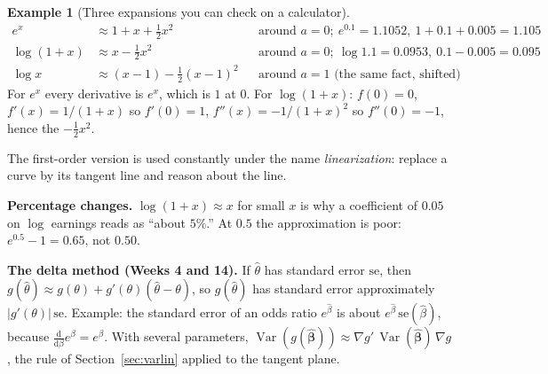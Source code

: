\documentclass[11pt]{article}
\theoremstyle{definition}
\newtheorem{example}{Example}[section]
\DeclareMathOperator{\Var}{Var}
\newcommand{\bbeta}{\bm{\beta}}
\newcommand{\dd}{\mathrm{d}}
\begin{document}
\begin{center}
\end{center}

\begin{example}[Three expansions you can check on a calculator]
\begin{align*}
  e^{x} &\approx 1 + x + \tfrac12 x^2 && \text{around } a = 0;\ e^{0.1} = 1.1052,\ 1 + 0.1 + 0.005 = 1.105 \\
  \log(1+x) &\approx x - \tfrac12 x^2 && \text{around } a = 0;\ \log 1.1 = 0.0953,\ 0.1 - 0.005 = 0.095 \\
  \log x &\approx (x-1) - \tfrac12 (x-1)^2 && \text{around } a = 1 \text{ (the same fact, shifted)}
\end{align*}
For $e^x$ every derivative is $e^x$, which is $1$ at $0$. For $\log(1+x)$:
$f(0) = 0$, $f'(x) = 1/(1+x)$ so $f'(0) = 1$, $f''(x) = -1/(1+x)^2$ so
$f''(0) = -1$, hence the $-\tfrac12 x^2$.
\end{example}

The first-order version is used constantly under the name
\emph{linearization}: replace a curve by its tangent line and reason about
the line.

\begin{inthecourse}
\textbf{Percentage changes.} $\log(1+x) \approx x$ for small $x$ is why a
coefficient of $0.05$ on $\log$ earnings reads as ``about $5\%$.'' At
$0.5$ the approximation is poor: $e^{0.5} - 1 = 0.65$, not $0.50$.

\textbf{The delta method (Weeks 4 and 14).} If $\hat\theta$ has standard
error $\mathrm{se}$, then $g(\hat\theta) \approx g(\theta) +
g'(\theta)(\hat\theta - \theta)$, so $g(\hat\theta)$ has standard error
approximately $|g'(\theta)|\,\mathrm{se}$. Example: the standard error of
an odds ratio $e^{\hat\beta}$ is about $e^{\hat\beta}\,\mathrm{se}(\hat\beta)$,
because $\frac{\dd}{\dd\beta}e^{\beta} = e^{\beta}$. With several
parameters, $\Var(g(\hat{\bbeta})) \approx \nabla g'\,\Var(\hat{\bbeta})\,\nabla g$,
the rule of Section~\ref{sec:varlin} applied to the tangent plane.
\end{inthecourse}
\end{document}
